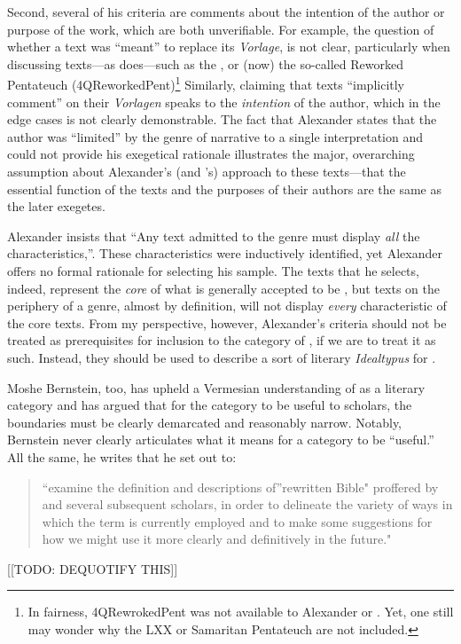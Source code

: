 Second, several of his criteria are comments about the intention of the author or purpose of the work, which are both unverifiable. For example, the question of whether a \rwb text was ``meant'' to replace its \emph{Vorlage}, is not clear, particularly when discussing texts---as \vermes does---such as the \pTarg, or (now) the so-called Reworked Pentateuch (4QReworkedPent)\footnote{In fairness, 4QRewrokedPent was not available   to Alexander or \vermes. Yet, one still may wonder why   the LXX or Samaritan Pentateuch are not included.} Similarly, claiming that \rwb texts ``implicitly comment'' on their \emph{Vorlagen} speaks to the \emph{intention} of the author, which in the edge cases is not clearly demonstrable. The fact that Alexander states that the author was ``limited'' by the genre of narrative to a single interpretation and could not provide his exegetical rationale illustrates the major, overarching assumption about Alexander's (and \vermes's) approach to these texts---that the essential function of the texts and the purposes of their authors are the same as the later exegetes. 

Alexander insists that ``Any text admitted to the genre must display \emph{all} the characteristics,''\autocite[119 n. 11]{alexander_carson-williamson1988}. These characteristics were inductively identified, yet Alexander offers no formal rationale for selecting his sample. The texts that he selects, indeed, represent the \emph{core} of what is generally accepted to be \rwb, but texts on the periphery of a genre, almost by definition, will not display \emph{every} characteristic of the core texts. From my perspective, however, Alexander's criteria should not be treated as prerequisites for inclusion to the category of \rwb, if we are to treat it as such. Instead, they should be used to describe a sort of literary \emph{Idealtypus} for \rwb. 

Moshe Bernstein, too, has upheld a Vermesian understanding of \rwb as a literary category and has argued that for the category to be useful to scholars, the boundaries must be clearly demarcated and reasonably narrow.\autocite{bernstein_textus2005} Notably, Bernstein never clearly articulates what it means for a category to be ``useful.'' All the same, he writes that he set out to: 

\begin{quote}
    ``examine the definition and descriptions of''rewritten Bible" proffered by \vermes and several subsequent scholars, in order to delineate the variety of ways in which the term is currently employed and to make some suggestions for how we might use it more clearly and definitively in the future." \autocite[171--172]{bernstein_textus2005}
\end{quote} [[TODO: DEQUOTIFY THIS]]

